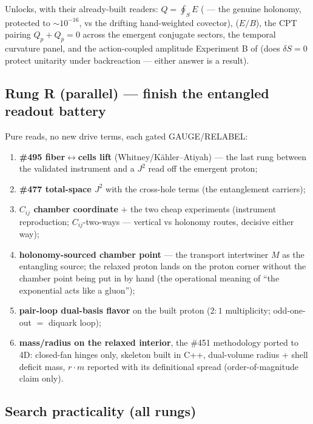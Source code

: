 \documentclass[11pt]{article}
\begin{document}
Unlocks, with their already-built readers: $Q = \oint_S E$ ( --- the
genuine holonomy, protected to $\sim 10^{-16}$, vs the drifting hand-weighted covector),
 ($E/B$), the CPT pairing $Q_p + Q_{\bar p} = 0$ across the
emergent conjugate sectors, the temporal curvature panel, and the action-coupled
amplitude Experiment B of  (does
$\delta S = 0$ protect unitarity under backreaction --- either answer is a result).

\subsection{Rung R (parallel) --- finish the entangled readout battery}
\label{sec:rungR}

Pure reads, no new drive terms, each gated GAUGE/RELABEL:
\begin{enumerate}[leftmargin=2em]
  \item \textbf{\#495 fiber$\leftrightarrow$cells lift} (Whitney/K\"ahler--Atiyah) ---
        the last rung between the validated instrument and a $J^2$ read off the emergent
        proton;
  \item \textbf{\#477 total-space $J^2$} with the cross-hole terms (the entanglement
        carriers);
  \item \textbf{$C_{ij}$ chamber coordinate} $+$ the two cheap
         experiments (instrument reproduction;
        $C_{ij}$-two-ways --- vertical vs holonomy routes, decisive either way);
  \item \textbf{holonomy-sourced chamber point} --- the transport intertwiner $M$ as the
        entangling source; the relaxed proton lands on the proton corner without the
        chamber point being put in by hand (the operational meaning of ``the exponential
        acts like a gluon'');
  \item \textbf{pair-loop dual-basis flavor} on the built proton ($2{:}1$ multiplicity;
        odd-one-out $=$ diquark loop);
  \item \textbf{mass/radius on the relaxed interior}, the \#451 methodology ported to
        4D: closed-fan hinges only, skeleton built in C++, dual-volume radius $+$ shell
        deficit mass, $r \cdot m$ reported with its definitional spread
        (order-of-magnitude claim only).
\end{enumerate}

\subsection{Search practicality (all rungs)}
\label{sec:search}
\end{document}
